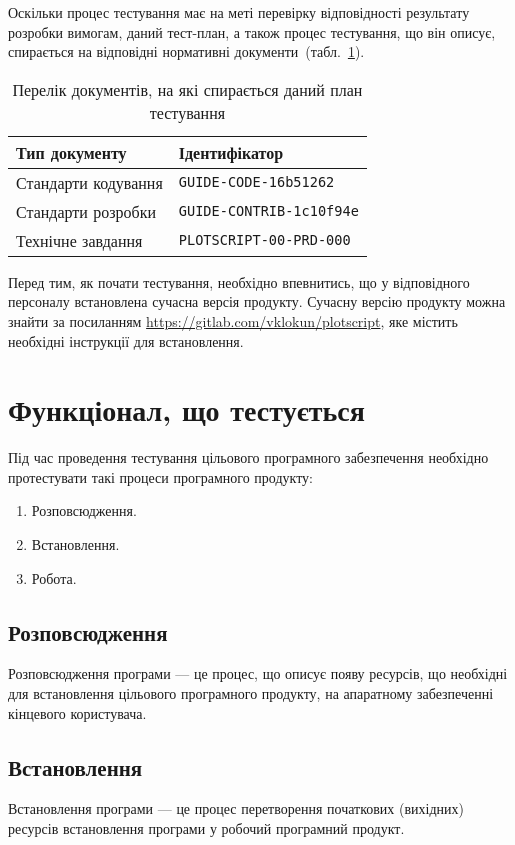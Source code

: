 \documentclass[a4paper,oneside,DIV=12,12pt]{scrartcl}
\newcommand{\theprdcode}{PLOTSCRIPT-00-PRD-000}
\newcommand{\printprdcode}{\texttt{\theprdcode}}
\newcommand{\thecodeguidecode}{GUIDE-CODE-16b51262}
\newcommand{\printcodeguidecode}{\texttt{\thecodeguidecode}}
\newcommand{\thecontribguidecode}{GUIDE-CONTRIB-1c10f94e}
\newcommand{\printcontribguidecode}{\texttt{\thecontribguidecode}}
\begin{document}
		Оскільки процес тестування має на меті перевірку відповідності результату розробки вимогам, даний тест-план, а також процес тестування, що він описує, спирається на відповідні нормативні документи~(табл.~\ref{tab:reference-docs}).
		
		\begin{table}[!htbp]
		\centering
			\begin{tabular}{ll}
				\toprule
					Тип документу & Ідентифікатор\\
				\midrule
					Стандарти кодування & \printcodeguidecode \\
					Стандарти розробки  & \printcontribguidecode\\
					Технічне завдання   & \printprdcode \\
				\bottomrule
			\end{tabular}
		\caption{Перелік документів, на які спирається даний план тестування}
		\label{tab:reference-docs}
		\end{table}
		
		Перед тим, як почати тестування, необхідно впевнитись, що у відповідного персоналу встановлена сучасна версія продукту. Сучасну версію продукту можна знайти за посиланням \url{https://gitlab.com/vklokun/plotscript}, яке містить необхідні інструкції для встановлення.
		
	\section{Функціонал, що тестується}
		Під час проведення тестування цільового програмного забезпечення необхідно протестувати такі процеси програмного продукту:
		\begin{enumerate}
			\item Розповсюдження.
			\item Встановлення.
			\item Робота.
		\end{enumerate}
		
		\subsection{Розповсюдження}
			Розповсюдження програми --- це процес, що описує появу ресурсів, що необхідні для встановлення цільового програмного продукту, на апаратному забезпеченні кінцевого користувача.
			
		\subsection{Встановлення}
			Встановлення програми --- це процес перетворення початкових (вихідних) ресурсів встановлення програми у робочий програмний продукт.
			
\end{document}
